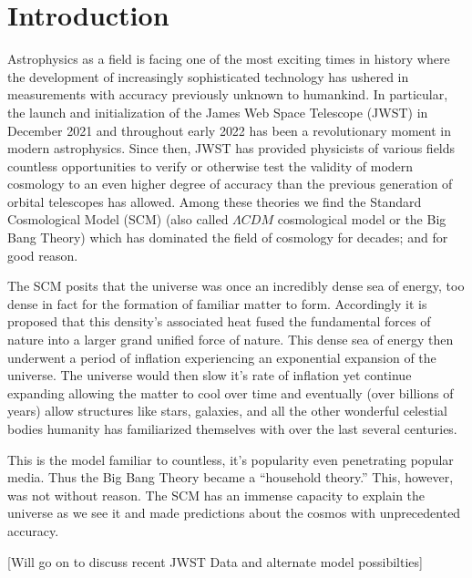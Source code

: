 \documentclass[a4paper]{article}
\begin{document}
    \section{\textbf{Introduction}}
    Astrophysics as a field is facing one of the most exciting times in history
    where the development of increasingly sophisticated technology has ushered
    in measurements with accuracy previously unknown to humankind. In
    particular, the launch and initialization of the James Web Space Telescope
    (JWST) in December 2021 and throughout early 2022 has been a revolutionary
    moment in modern astrophysics. Since then, JWST has provided physicists of
    various fields countless opportunities to verify or otherwise test the
    validity of modern cosmology to an even higher degree of accuracy than the
    previous generation of orbital telescopes has allowed. Among these theories
    we find the Standard Cosmological Model (SCM) (also called $\Lambda CDM$
    cosmological model or the Big Bang Theory) which has dominated the field of
    cosmology for decades; and for good reason.

    The SCM posits that the universe was once an incredibly dense sea of
    energy, too dense in fact for the formation of familiar matter to form.
    Accordingly it is proposed that this density’s associated heat fused the
    fundamental forces of nature into a larger grand unified force of nature.
    This dense sea of energy then underwent a period of inflation experiencing
    an exponential expansion of the universe. The universe would then slow it’s
    rate of inflation yet continue expanding allowing the matter to cool over
    time and eventually (over billions of years) allow structures like stars,
    galaxies, and all the other wonderful celestial bodies humanity has
    familiarized themselves with over the last several centuries.

    This is the model familiar to countless, it’s popularity even penetrating
    popular media. Thus the Big Bang Theory became a “household theory.” This,
    however, was not without reason. The SCM has an immense capacity to explain
    the universe as we see it and made predictions about the cosmos with
    unprecedented accuracy.
    \begin{center}
        [Will go on to discuss recent JWST Data and alternate model
        possibilties]
    \end{center}
\end{document}
